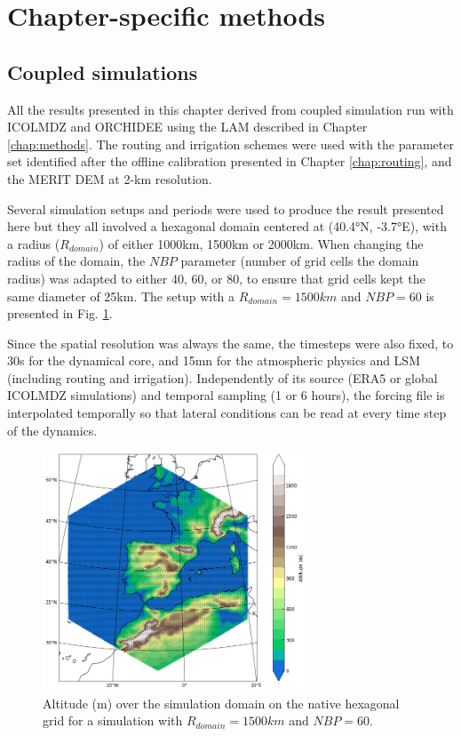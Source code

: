 
\section{Chapter-specific methods}
\subsection{Coupled simulations}
All the results presented in this chapter derived from coupled simulation run with ICOLMDZ and ORCHIDEE using the LAM described in Chapter \ref{chap:methods}. The routing and irrigation schemes were used with the parameter set identified after the offline calibration presented in Chapter \ref{chap:routing}, and the MERIT DEM at 2-km resolution.

Several simulation setups and periods were used to produce the result presented here but they all involved a hexagonal domain centered at (40.4°N, -3.7°E), with a radius ($R_{domain}$) of either 1000km, 1500km or 2000km. When changing the radius of the domain, the $NBP$ parameter (number of grid cells the domain radius) was adapted to either 40, 60, or 80, to ensure that grid cells kept the same diameter of 25km. The setup with a $R_{domain}=1500km$ and $NBP=60$ is presented in Fig. \ref{fig:domain_full_hex}. 

Since the spatial resolution was always the same, the timesteps were also fixed, to 30s for the dynamical core, and 15mn for the atmospheric physics and LSM (including routing and irrigation).
Independently of its source (ERA5 or global ICOLMDZ simulations) and temporal sampling (1 or 6 hours), the forcing file is interpolated temporally so that lateral conditions can be read at every time step of the dynamics.

\begin{figure}[h]
    \centering
    \includegraphics[width=0.7\textwidth]{images/chap4/f01.png}
    \caption{Altitude (m) over the simulation domain on the native hexagonal grid for a simulation with $R_{domain}=1500km$ and $NBP=60$.}
    \label{fig:domain_full_hex}
\end{figure}

